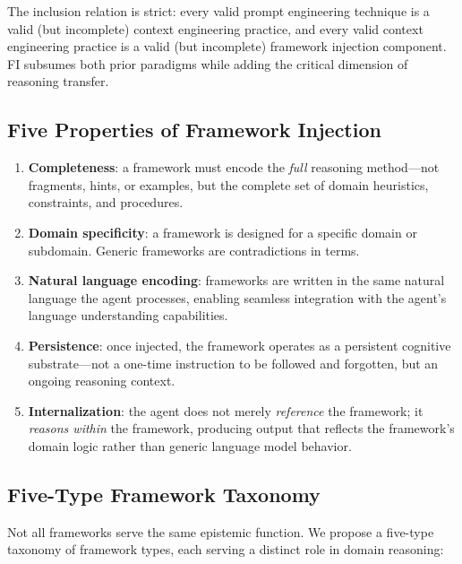 \documentclass[12pt,a4paper]{article}
\begin{document}
The inclusion relation is strict: every valid prompt engineering technique is a valid (but incomplete) context engineering practice, and every valid context engineering practice is a valid (but incomplete) framework injection component. FI subsumes both prior paradigms while adding the critical dimension of reasoning transfer.

\subsection{Five Properties of Framework Injection}

\begin{enumerate}
  \item \textbf{Completeness}: a framework must encode the \emph{full} reasoning method---not fragments, hints, or examples, but the complete set of domain heuristics, constraints, and procedures.
  \item \textbf{Domain specificity}: a framework is designed for a specific domain or subdomain. Generic frameworks are contradictions in terms.
  \item \textbf{Natural language encoding}: frameworks are written in the same natural language the agent processes, enabling seamless integration with the agent's language understanding capabilities.
  \item \textbf{Persistence}: once injected, the framework operates as a persistent cognitive substrate---not a one-time instruction to be followed and forgotten, but an ongoing reasoning context.
  \item \textbf{Internalization}: the agent does not merely \emph{reference} the framework; it \emph{reasons within} the framework, producing output that reflects the framework's domain logic rather than generic language model behavior.
\end{enumerate}

\subsection{Five-Type Framework Taxonomy}

Not all frameworks serve the same epistemic function. We propose a five-type taxonomy of framework types, each serving a distinct role in domain reasoning:
\end{document}
